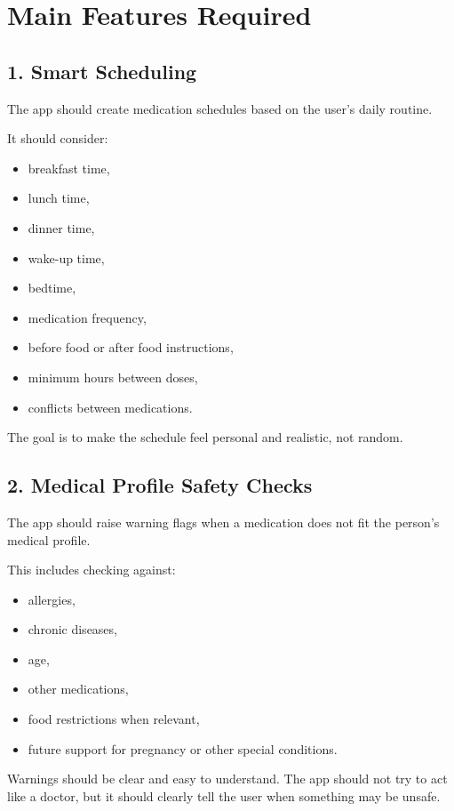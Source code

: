 \documentclass[11pt,a4paper]{article}
\begin{document}
\section{Main Features Required}

\subsection{1. Smart Scheduling}
The app should create medication schedules based on the user's daily routine.

It should consider:
\begin{itemize}
    \item breakfast time,
    \item lunch time,
    \item dinner time,
    \item wake-up time,
    \item bedtime,
    \item medication frequency,
    \item before food or after food instructions,
    \item minimum hours between doses,
    \item conflicts between medications.
\end{itemize}

The goal is to make the schedule feel personal and realistic, not random.

\subsection{2. Medical Profile Safety Checks}
The app should raise warning flags when a medication does not fit the person's medical profile.

This includes checking against:
\begin{itemize}
    \item allergies,
    \item chronic diseases,
    \item age,
    \item other medications,
    \item food restrictions when relevant,
    \item future support for pregnancy or other special conditions.
\end{itemize}

Warnings should be clear and easy to understand. The app should not try to act like a doctor, but it should clearly tell the user when something may be unsafe.
\end{document}
